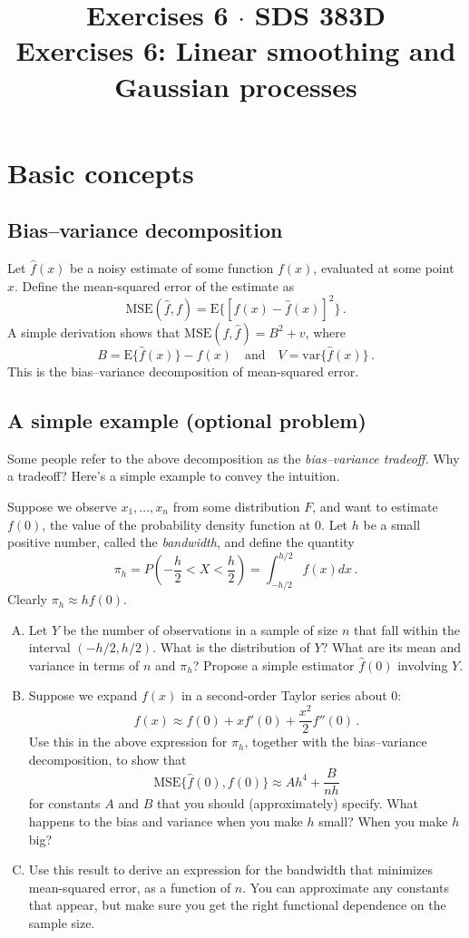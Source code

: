 \documentclass[11pt]{article}
\title{Exercises 6 $\cdot$ SDS 383D \\ Exercises 6: Linear smoothing and Gaussian processes}
\date{}  %
\newcommand{\E}{\mbox{E}}
\newcommand{\MSE}{\mbox{MSE}}
\newcommand{\var}{\mbox{var}}
\begin{document}
\maketitle%


\section{Basic concepts}

\subsection{Bias--variance decomposition}

Let $\hat{f}(x)$ be a noisy estimate of some function $f(x)$, evaluated at some point $x$.  Define the mean-squared error of the estimate as
$$
\MSE(\hat{f}, f) = \E\{ [ f(x) - \hat{f}(x)]^2 \} \, .
$$
A simple derivation shows that $\MSE(f, \hat{f}) = B^2 + v$, where
$$
B = \E \{ \hat{f}(x) \} - f(x) \quad \mbox{and} \quad V = \var\{ \hat{f}(x) \} \, .
$$
This is the bias--variance decomposition of mean-squared error.

\subsection{A simple example  (optional problem)}

Some people refer to the above decomposition as the \textit{bias--variance tradeoff.}  Why a tradeoff?  Here's a simple example to convey the intuition.

Suppose we observe $x_1, \ldots, x_n$ from some distribution $F$, and want to estimate $f(0)$, the value of the probability density function at 0.  Let $h$ be a small positive number, called the \textit{bandwidth}, and define the quantity
$$
\pi_h = P\left( -\frac{h}{2} < X < \frac{h}{2} \right) = \int_{-h/2}^{h/2} f(x) dx \, .
$$
Clearly $\pi_h \approx h f(0)$.

\begin{enumerate}[(A)]
\item Let $Y$ be the number of observations in a sample of size $n$ that fall within the interval $(-h/2, h/2)$.  What is the distribution of $Y$?  What are its mean and variance in terms of $n$ and $\pi_h$?  Propose a simple estimator $\hat{f}(0)$ involving $Y$.
\item Suppose we expand $f(x)$ in a second-order Taylor series about $0$:
$$
f(x) \approx f(0) + x f'(0) + \frac{x^2}{2} f''(0) \, .
$$
Use this in the above expression for $\pi_h$, together with the bias--variance decomposition, to show that
$$
\MSE\{ \hat{f}(0), f(0) \} \approx A h^4 + \frac{B}{nh}
$$
for constants $A$ and $B$ that you should (approximately) specify.  What happens to the bias and variance when you make $h$ small?  When you make $h$ big?

\item Use this result to derive an expression for the bandwidth that minimizes mean-squared error, as a function of $n$.  You can approximate any constants that appear, but make sure you get the right functional dependence on the sample size.

\end{enumerate}
\end{document}
